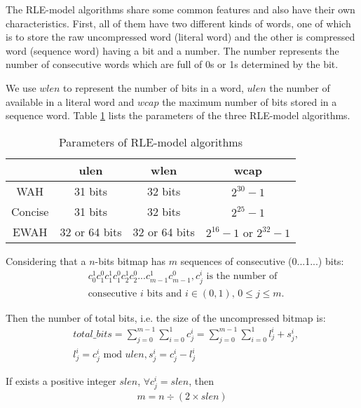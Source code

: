 The RLE-model algorithms share some common features and also have their own characteristics. First, all of them have two different kinds of words, one of which is to store the raw uncompressed word (literal word) and the other is compressed word (sequence word) having a bit and a number. The number represents the number of consecutive words which are full of 0s or 1s determined by the bit.

We use $wlen$ to represent the number of bits in a word, $ulen$ the number of available in a literal word and $wcap$ the maximum number of bits stored in a sequence word. Table \ref{tbl:bm:bmparms} lists the parameters of the three RLE-model algorithms.

\begin{table}[h]
\centering
\begin{tabular}{|c|c|c|c|}
\hline
& ulen & wlen & wcap \\
\hline
WAH & 31 bits & 32 bits & $2^{30} - 1$ \\
\hline
Concise & 31 bits & 32 bits & $2^{25} - 1$ \\
\hline
EWAH & 32 or 64 bits & 32 or 64 bits & $2^{16} - 1 \text{ or } 2^{32} - 1$ \\
\hline
\end{tabular}
\caption{Parameters of RLE-model algorithms}
\label{tbl:bm:bmparms}
\end{table}

Considering that a $n$-bits bitmap has $m$ sequences of consecutive (0...1...) bits:
\begin{align*}
& c^1_0c^0_1c^1_1c^0_1c^1_2c^0_2...c^1_{m - 1}c^0_{m - 1}, c^i_j \text{ is the number of } \\
& \text{consecutive } i \text{ bits and } i \in (0, 1),\, 0 \leq j \leq m.  
\end{align*}

Then the number of total bits, i.e. the size of the uncompressed bitmap is:
\begin{align*}
& total\_bits = \sum_{j = 0}^{m - 1} \sum_{i = 0}^1 c^i_j = \sum_{j = 0}^{m - 1} \sum_{i = 0}^1 l^i_j + s^i_j, \\
& l^i_j = c^i_j \text{ mod } ulen, s^i_j = c^i_j - l^i_j
\end{align*}

If exists a positive integer $slen$, $\forall c^i_j = slen$, then
\begin{align}
m = n \div (2 \times slen) \label{eq:seqnum}
\end{align}

